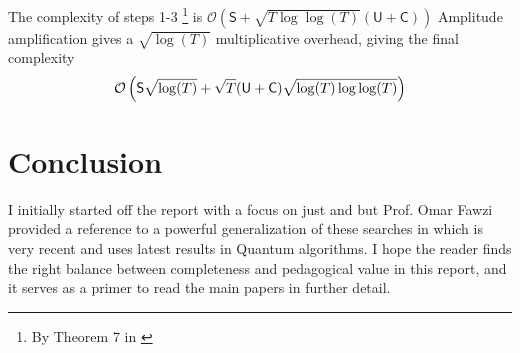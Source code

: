 \documentclass{article}
\newcommand{\bigO}[1]{\mathcal{O}\left( #1 \right)}
\newcommand{\PM}{\mathcal{P}}
\begin{document}

The complexity of steps 1-3 \footnote{By Theorem 7 in \cite{Ambainis2019QuadraticSF}} is
$\bigO{\mathsf{S}+\sqrt{T\log\log(T)}(\mathsf{U}+\mathsf{C})}$
Amplitude amplification gives a $\sqrt{\log(T)}$ multiplicative overhead, giving the final complexity $$\bigO{\mathsf{S}\sqrt{\log(T)}+\sqrt{T}({\sf U}+{\sf C})\sqrt{\log(T)\log\log(T)}}$$
\section{Conclusion}
I initially started off the report with a focus on just \cite{Kempe2003QuantumRW} and \cite{Shenvi2003QuantumRS} but Prof. Omar Fawzi provided a reference to a powerful generalization of these searches in \cite{Ambainis2019QuadraticSF} which is very recent and uses latest results \cite{Apers2018QuantumFM} in Quantum algorithms. I hope the reader finds the right balance between completeness and pedagogical value in this report, and it serves as a primer to read the main papers in further detail.


\end{document}
